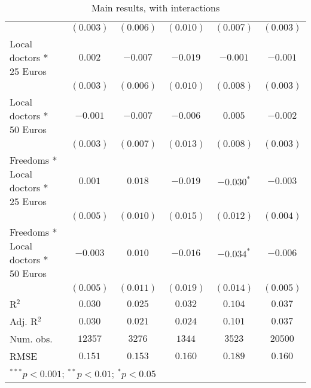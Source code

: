 \begin{table}[h!]
\begin{center}
\begin{tabular}{l c c c c c}
                                    & $(0.003)$      & $(0.006)$     & $(0.010)$     & $(0.007)$     & $(0.003)$      \\
Local doctors * 25 Euros            & $0.002$        & $-0.007$      & $-0.019$      & $-0.001$      & $-0.001$       \\
                                    & $(0.003)$      & $(0.006)$     & $(0.010)$     & $(0.008)$     & $(0.003)$      \\
Local doctors * 50 Euros            & $-0.001$       & $-0.007$      & $-0.006$      & $0.005$       & $-0.002$       \\
                                    & $(0.003)$      & $(0.007)$     & $(0.013)$     & $(0.008)$     & $(0.003)$      \\
Freedoms * Local doctors * 25 Euros & $0.001$        & $0.018$       & $-0.019$      & $-0.030^{*}$  & $-0.003$       \\
                                    & $(0.005)$      & $(0.010)$     & $(0.015)$     & $(0.012)$     & $(0.004)$      \\
Freedoms * Local doctors * 50 Euros & $-0.003$       & $0.010$       & $-0.016$      & $-0.034^{*}$  & $-0.006$       \\
                                    & $(0.005)$      & $(0.011)$     & $(0.019)$     & $(0.014)$     & $(0.005)$      \\
\hline
R$^2$                               & $0.030$        & $0.025$       & $0.032$       & $0.104$       & $0.037$        \\
Adj. R$^2$                          & $0.030$        & $0.021$       & $0.024$       & $0.101$       & $0.037$        \\
Num. obs.                           & $12357$        & $3276$        & $1344$        & $3523$        & $20500$        \\
RMSE                                & $0.151$        & $0.153$       & $0.160$       & $0.189$       & $0.160$        \\
\hline
\multicolumn{6}{l}{\scriptsize{$^{***}p<0.001$; $^{**}p<0.01$; $^{*}p<0.05$}}
\end{tabular}
\caption{Main results, with interactions}
\label{table:coefficients}
\end{center}
\end{table}


